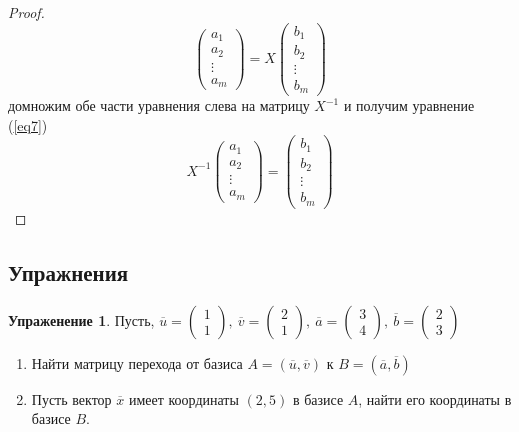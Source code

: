 \documentclass[]{article}
\theoremstyle{theorem}
\theoremstyle{definition}
\newtheorem{tk}{Упраженение}
\begin{document}
\begin{proof}
\begin{equation*}
	\begin{pmatrix}
		a_1
		\\
		a_2
		\\
		\vdots
		\\
		a_m
	\end{pmatrix}
	=X
	\begin{pmatrix}
		b_1
		\\
		b_2
		\\
		\vdots
		\\
		b_m
	\end{pmatrix}
\end{equation*}
домножим обе части уравнения слева на матрицу $X^{-1}$ и получим уравнение (\ref{eq7})
\begin{equation*}
X^{-1}
\begin{pmatrix}
	a_1
	\\
	a_2
	\\
	\vdots
	\\
	a_m
\end{pmatrix}
=
\begin{pmatrix}
	b_1
	\\
	b_2
	\\
	\vdots
	\\
	b_m
\end{pmatrix}
\end{equation*}
\end{proof}

\subsection{Упражнения}
\begin{tk}
	Пусть, $\overline{u}=
	\begin{pmatrix}
	1\\
	1
	\end{pmatrix},\
	\overline{v}=
	\begin{pmatrix}
		2\\
		1
	\end{pmatrix},\
	\overline{a}=
	\begin{pmatrix}
		3\\
		4
	\end{pmatrix},\
	\overline{b}=
	\begin{pmatrix}
		2\\
		3
	\end{pmatrix}$
	\begin{enumerate}
		\item
		Найти матрицу перехода от базиса $A=(\overline{u}, \overline{v})$ к $B=(\overline{a}, \overline{b})$ 
		\item
		Пусть вектор $\overline{x}$ имеет координаты $(2,5)$ в базисе $A$, найти его координаты в базисе $B$.
	\end{enumerate}
\end{tk}
\end{document}
